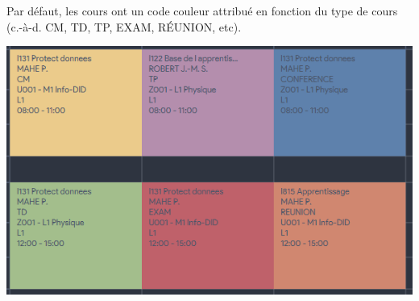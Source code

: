 \documentclass[a4paper,french,final]{memoir}
\begin{document}
\begin{minipage}{0.45\textwidth}
Par défaut, les cours ont un code couleur attribué en fonction du type de cours (c.-à-d. CM, TD, TP, EXAM, RÉUNION, etc).
\end{minipage}
\hspace{0.5cm}
\begin{minipage}{0.45\textwidth}
\includegraphics[width=\textwidth]{figures/slotColorCode.png}
\end{minipage}
\end{document}
